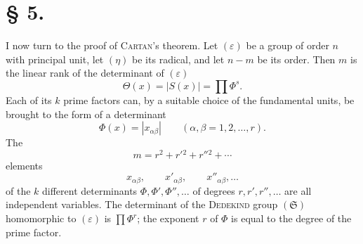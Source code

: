 \documentclass[11pt]{article}
\newcommand{\eps}{\varepsilon}
\newcommand{\grS}{\mathfrak{S}}
\begin{document}
\section*{§ 5.}

I now turn to the proof of \textsc{Cartan}'s theorem. Let $(\eps)$ be a group of order $n$ with principal unit, let $(\eta)$ be its radical, and let $n-m$ be its order. Then $m$ is the linear rank of the determinant of $(\eps)$
\begin{equation}\tag{1.}
 \Theta(x)=|S(x)|=\prod \Phi^{s}.
\end{equation}
Each of its $k$ prime factors can, by a suitable choice of the fundamental units, be brought to the form of a determinant
\begin{equation}\tag{2.}
 \Phi(x)=|x_{\alpha\beta}|\qquad(\alpha,\beta=1,2,\ldots,r).
\end{equation}
The
\begin{equation}\tag{3.}
 m=r^2+r'{}^2+r''{}^2+\cdots
\end{equation}
elements
\begin{equation}\tag{4.}
 x_{\alpha\beta},\qquad x'_{\alpha\beta},\qquad x''_{\alpha\beta},\ldots
\end{equation}
of the $k$ different determinants $\Phi,\Phi',\Phi'',\ldots$ of degrees $r,r',r'',\ldots$ are all independent variables. The determinant of the \textsc{Dedekind} group $(\grS)$ homomorphic to $(\eps)$ is $\prod \Phi^r$; the exponent $r$ of $\Phi$ is equal to the degree of the prime factor.
\end{document}
